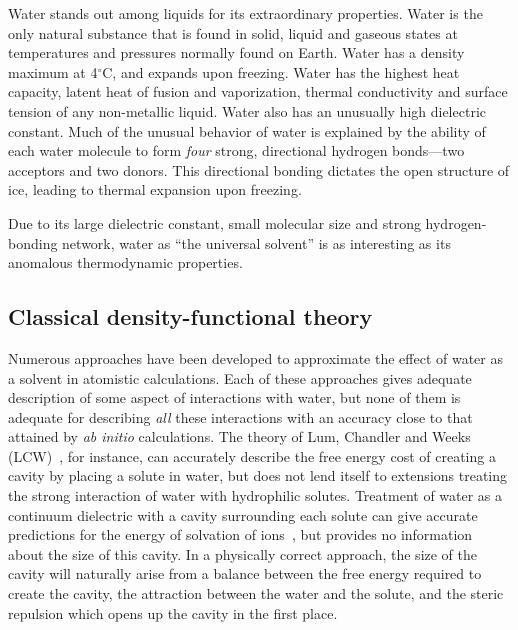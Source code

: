 \documentclass[letterpaper,twocolumn,amsmath,amssymb,prb]{revtex4-1}
\newcommand{\needsworknow}[1]{\textcolor{red}{[\emph{#1}]}}
\begin{document}
Water stands out among liquids for its extraordinary properties.
Water is the only natural substance that is found in solid, liquid and
gaseous states at temperatures and pressures normally found on Earth.
Water has a density maximum at 4$^\circ$C, and expands upon freezing.
Water has the highest heat capacity, latent heat of fusion and
vaporization, thermal conductivity and surface tension of any
non-metallic liquid.  Water also has an unusually high dielectric constant.
Much of the unusual behavior of water is explained by the ability of
each water molecule to form \emph{four} strong, directional hydrogen
bonds---two acceptors and two donors.  This directional bonding
dictates the open structure of ice, leading to thermal expansion upon
freezing.

Due to its large dielectric constant, small molecular size and strong
hydrogen-bonding network, water as ``the universal solvent'' is as
interesting as its anomalous thermodynamic properties.

\subsection{Classical density-functional theory}


Numerous approaches have been developed to approximate the effect of water
as a solvent in atomistic calculations.  Each of these approaches gives
adequate description of some aspect of interactions with water, but none of
them is adequate for describing \emph{all} these interactions with an
accuracy close to that attained by \emph{ab initio} calculations.  The
theory of Lum, Chandler and Weeks (LCW)~\cite{lum1999hydrophobicity}, for 
instance, can
accurately describe the free energy cost of creating a cavity by placing a
solute in water, but does not lend itself to extensions treating the strong
interaction of water with hydrophilic solutes.  Treatment of water as a
continuum dielectric with a cavity surrounding each solute can give
accurate predictions for the energy of solvation of ions~\cite{latimer1939,
rashin1985, zhan1998, hsu1999, hildebrandt2004, hildebrandt2007}, but
provides no information about the size of this cavity.  In a physically
correct approach, the size of the cavity will naturally arise from a
balance between the free energy required to create the cavity, the
attraction between the water and the solute, and the steric repulsion which
opens up the cavity in the first place.
\end{document}
